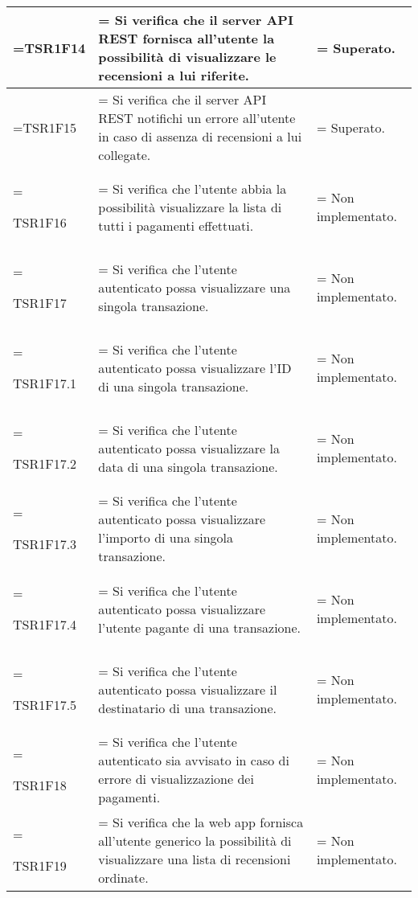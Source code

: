 \begin{xltabular}{\textwidth} {
            >{\hsize\linewidth=\hsize}X
            >{\hsize\linewidth=\hsize}X
            >{\hsize\linewidth=\hsize}X
        }
        TSR1F14 &
        Si verifica che il server API REST fornisca all'utente la possibilità di visualizzare le recensioni a lui riferite. &
        Superato.
        \\ \hline

        TSR1F15 &
        Si verifica che il server API REST notifichi un errore all'utente in caso di assenza di recensioni a lui collegate. &
        Superato.
        \\ \hline


        TSR1F16 &
        Si verifica che l'utente abbia la possibilità visualizzare la lista di tutti i pagamenti
        effettuati. &
        Non implementato.
        \\ \hline

        TSR1F17 &
        Si verifica che l'utente autenticato possa visualizzare una singola transazione. &
        Non implementato.
        \\ \hline

        TSR1F17.1 &
        Si verifica che l'utente autenticato possa visualizzare l'ID di una singola transazione. &
        Non implementato.
        \\ \hline


        TSR1F17.2 &
        Si verifica che l'utente autenticato possa visualizzare la data di una singola transazione. &
        Non implementato.
        \\ \hline

        TSR1F17.3 &
        Si verifica che l'utente autenticato possa visualizzare l'importo di una singola transazione. &
        Non implementato.
        \\ \hline

        TSR1F17.4 &
        Si verifica che l'utente autenticato possa visualizzare l'utente pagante di una transazione. &
        Non implementato.
        \\ \hline

        TSR1F17.5 &
        Si verifica che l'utente autenticato possa visualizzare il destinatario di una transazione. &
        Non implementato.
        \\ \hline

        TSR1F18 &
        Si verifica che l'utente autenticato sia avvisato in caso di errore di visualizzazione dei pagamenti. &
        Non implementato.
        \\ \hline

        TSR1F19 &
        Si verifica che la web app fornisca all'utente generico la possibilità di visualizzare una lista di recensioni ordinate. &
        Non implementato. 
        \\ \hline


\end{xltabular}
